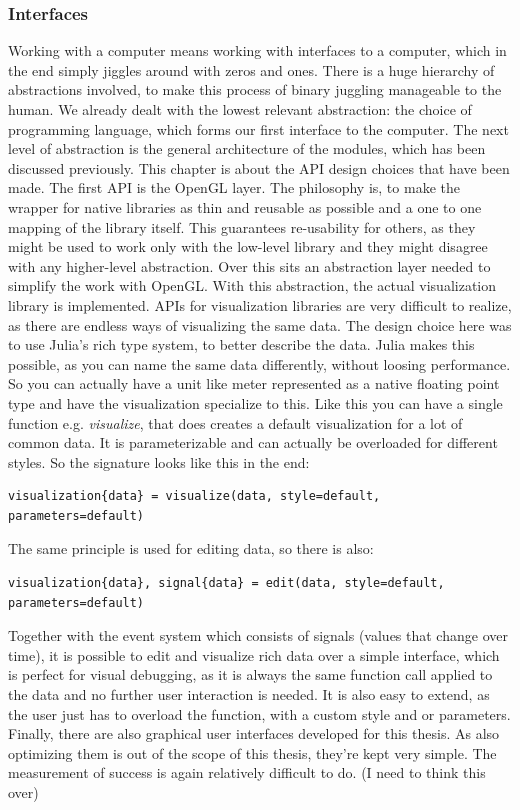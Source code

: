\subsubsection{Interfaces}
Working with a computer means working with interfaces to a computer, which in the end simply jiggles around with zeros and ones. There is a huge hierarchy of abstractions involved, to make this process of binary juggling manageable to the human.
We already dealt with the lowest relevant abstraction: the choice of programming language, which forms our first interface to the computer.
The next level of abstraction is the general architecture of the modules, which has been discussed previously. 
This chapter is about the API design choices that have been made.
The first API is the OpenGL layer. The philosophy is, to make the wrapper for native libraries as thin and reusable as possible and a one to one mapping of the library itself.
This guarantees re-usability for others, as they might be used to work only with the low-level library and they might disagree with any higher-level abstraction.
Over this sits an abstraction layer needed to simplify the work with OpenGL.
With this abstraction, the actual visualization library is implemented.
APIs for visualization libraries are very difficult to realize, as there are endless ways of visualizing the same data.
The design choice here was to use Julia's rich type system, to better describe the data. 
Julia makes this possible, as you can name the same data differently, without loosing performance.
So you can actually have a unit like meter represented as a native floating point type and have the visualization specialize to this.
Like this you can have a single function e.g. \textit{visualize}, that does creates a default visualization for a lot of common data.
It is parameterizable and can actually be overloaded for different styles.
So the signature looks like this in the end:
\begin{lstlisting}
visualization{data} = visualize(data, style=default, parameters=default)
\end{lstlisting}
The same principle is used for editing data, so there is also:
\begin{lstlisting}
visualization{data}, signal{data} = edit(data, style=default, parameters=default)
\end{lstlisting}
Together with the event system which consists of signals (values that change over time), it is possible to edit and visualize rich data over a simple interface, which is perfect for visual debugging, as it is always the same function call applied to the data and no further user interaction is needed.
It is also easy to extend, as the user just has to overload the function, with a custom style and or parameters.
Finally, there are also graphical user interfaces developed for this thesis. As also optimizing them is out of the scope of this thesis, they're kept very simple.
The measurement of success is again relatively difficult to do. (I need to think this over)
